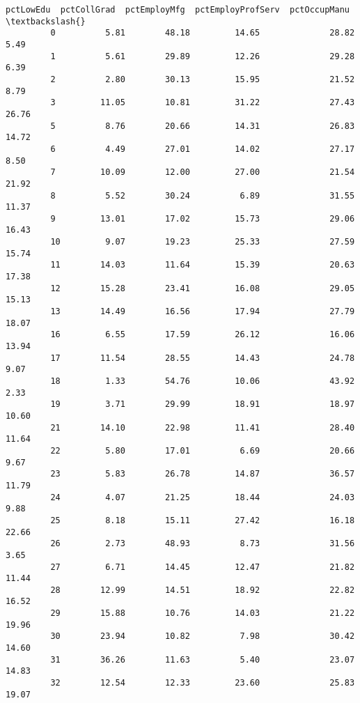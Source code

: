 \documentclass[11pt]{llncs}
\begin{document}
\begin{Verbatim}[commandchars=\\\{\}]
               pctLowEdu  pctCollGrad  pctEmployMfg  pctEmployProfServ  pctOccupManu  \textbackslash{}
         0          5.81        48.18         14.65              28.82          5.49   
         1          5.61        29.89         12.26              29.28          6.39   
         2          2.80        30.13         15.95              21.52          8.79   
         3         11.05        10.81         31.22              27.43         26.76   
         5          8.76        20.66         14.31              26.83         14.72   
         6          4.49        27.01         14.02              27.17          8.50   
         7         10.09        12.00         27.00              21.54         21.92   
         8          5.52        30.24          6.89              31.55         11.37   
         9         13.01        17.02         15.73              29.06         16.43   
         10         9.07        19.23         25.33              27.59         15.74   
         11        14.03        11.64         15.39              20.63         17.38   
         12        15.28        23.41         16.08              29.05         15.13   
         13        14.49        16.56         17.94              27.79         18.07   
         16         6.55        17.59         26.12              16.06         13.94   
         17        11.54        28.55         14.43              24.78          9.07   
         18         1.33        54.76         10.06              43.92          2.33   
         19         3.71        29.99         18.91              18.97         10.60   
         21        14.10        22.98         11.41              28.40         11.64   
         22         5.80        17.01          6.69              20.66          9.67   
         23         5.83        26.78         14.87              36.57         11.79   
         24         4.07        21.25         18.44              24.03          9.88   
         25         8.18        15.11         27.42              16.18         22.66   
         26         2.73        48.93          8.73              31.56          3.65   
         27         6.71        14.45         12.47              21.82         11.44   
         28        12.99        14.51         18.92              22.82         16.52   
         29        15.88        10.76         14.03              21.22         19.96   
         30        23.94        10.82          7.98              30.42         14.60   
         31        36.26        11.63          5.40              23.07         14.83   
         32        12.54        12.33         23.60              25.83         19.07   

\end{Verbatim}
\end{document}

